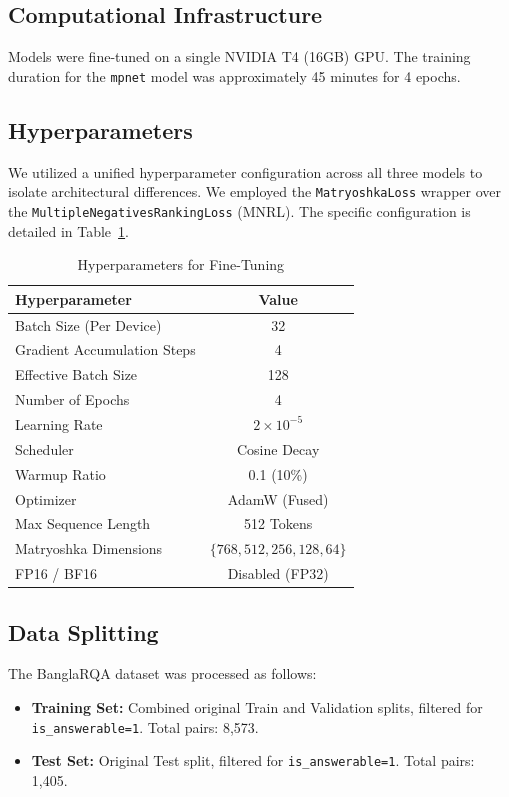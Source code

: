 \documentclass[manuscript,screen,review]{acmart}
\begin{document}
\subsection{Computational Infrastructure}
Models were fine-tuned on a single NVIDIA T4 (16GB) GPU. The training duration for the \texttt{mpnet} model was approximately 45 minutes for 4 epochs.

\subsection{Hyperparameters}
We utilized a unified hyperparameter configuration across all three models to isolate architectural differences. We employed the \texttt{MatryoshkaLoss} wrapper over the \texttt{MultipleNegativesRankingLoss} (MNRL). The specific configuration is detailed in Table~\ref{tab:hyperparameters}.

\begin{table}[h]
    \caption{Hyperparameters for Fine-Tuning}
    \label{tab:hyperparameters}
    \centering
    \begin{tabular}{lc}
        \toprule
        \textbf{Hyperparameter} & \textbf{Value} \\
        \midrule
        Batch Size (Per Device) & 32 \\
        Gradient Accumulation Steps & 4 \\
        Effective Batch Size & 128 \\
        Number of Epochs & 4 \\
        Learning Rate & $2 \times 10^{-5}$ \\
        Scheduler & Cosine Decay \\
        Warmup Ratio & 0.1 (10\%) \\
        Optimizer & AdamW (Fused) \\
        Max Sequence Length & 512 Tokens \\
        Matryoshka Dimensions & $\{768, 512, 256, 128, 64\}$ \\
        FP16 / BF16 & Disabled (FP32) \\
        \bottomrule
    \end{tabular}
\end{table}

\subsection{Data Splitting}
The BanglaRQA dataset was processed as follows:
\begin{itemize}
    \item \textbf{Training Set:} Combined original Train and Validation splits, filtered for \texttt{is\_answerable=1}. Total pairs: 8,573.
    \item \textbf{Test Set:} Original Test split, filtered for \texttt{is\_answerable=1}. Total pairs: 1,405.
\end{itemize}
\end{document}

